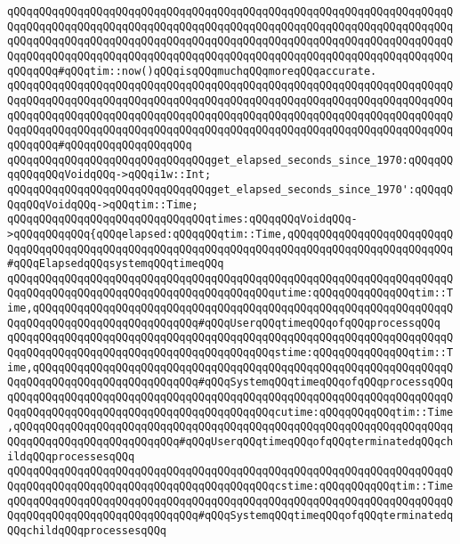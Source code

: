 \verb|qQQqqQQqqQQqqQQqqQQqqQQqqQQqqQQqqQQqqQQqqQQqqQQqqQQqqQQqqQQqqQQqqQQqqQQqqQQqqQQqqQQqqQQqqQQqqQQqqQQqqQQqqQQqqQQqqQQqqQQqqQQqqQQqqQQqqQQqqQQqqQQqqQQqqQQqqQQqqQQqqQQqqQQqqQQqqQQqqQQqqQQqqQQqqQQqqQQqqQQqqQQqqQQqqQQqqQQqqQQqqQQqqQQqqQQqqQQqqQQqqQQqqQQqqQQqqQQqqQQqqQQqqQQqqQQqqQQqqQQqqQQqqQQq#qQQqtim::now()qQQqisqQQqmuchqQQqmoreqQQqaccurate.|\newline
\verb|qQQqqQQqqQQqqQQqqQQqqQQqqQQqqQQqqQQqqQQqqQQqqQQqqQQqqQQqqQQqqQQqqQQqqQQqqQQqqQQqqQQqqQQqqQQqqQQqqQQqqQQqqQQqqQQqqQQqqQQqqQQqqQQqqQQqqQQqqQQqqQQqqQQqqQQqqQQqqQQqqQQqqQQqqQQqqQQqqQQqqQQqqQQqqQQqqQQqqQQqqQQqqQQqqQQqqQQqqQQqqQQqqQQqqQQqqQQqqQQqqQQqqQQqqQQqqQQqqQQqqQQqqQQqqQQqqQQqqQQqqQQqqQQq#qQQqqQQqqQQqqQQqqQQq|\newline
\verb|qQQqqQQqqQQqqQQqqQQqqQQqqQQqqQQqget_elapsed_seconds_since_1970:qQQqqQQqqQQqqQQqVoidqQQq->qQQqi1w::Int;|\newline
\verb|qQQqqQQqqQQqqQQqqQQqqQQqqQQqqQQqget_elapsed_seconds_since_1970':qQQqqQQqqQQqVoidqQQq->qQQqtim::Time;|\newline
\newline
\verb|qQQqqQQqqQQqqQQqqQQqqQQqqQQqqQQqtimes:qQQqqQQqVoidqQQq->qQQqqQQqqQQq{qQQqelapsed:qQQqqQQqtim::Time,qQQqqQQqqQQqqQQqqQQqqQQqqQQqqQQqqQQqqQQqqQQqqQQqqQQqqQQqqQQqqQQqqQQqqQQqqQQqqQQqqQQqqQQqqQQqqQQq#qQQqElapsedqQQqsystemqQQqtimeqQQq|\newline
\verb|qQQqqQQqqQQqqQQqqQQqqQQqqQQqqQQqqQQqqQQqqQQqqQQqqQQqqQQqqQQqqQQqqQQqqQQqqQQqqQQqqQQqqQQqqQQqqQQqqQQqqQQqqQQqqQQqutime:qQQqqQQqqQQqqQQqtim::Time,qQQqqQQqqQQqqQQqqQQqqQQqqQQqqQQqqQQqqQQqqQQqqQQqqQQqqQQqqQQqqQQqqQQqqQQqqQQqqQQqqQQqqQQqqQQqqQQq#qQQqUserqQQqtimeqQQqofqQQqprocessqQQq|\newline
\verb|qQQqqQQqqQQqqQQqqQQqqQQqqQQqqQQqqQQqqQQqqQQqqQQqqQQqqQQqqQQqqQQqqQQqqQQqqQQqqQQqqQQqqQQqqQQqqQQqqQQqqQQqqQQqqQQqstime:qQQqqQQqqQQqqQQqtim::Time,qQQqqQQqqQQqqQQqqQQqqQQqqQQqqQQqqQQqqQQqqQQqqQQqqQQqqQQqqQQqqQQqqQQqqQQqqQQqqQQqqQQqqQQqqQQqqQQq#qQQqSystemqQQqtimeqQQqofqQQqprocessqQQq|\newline
\verb|qQQqqQQqqQQqqQQqqQQqqQQqqQQqqQQqqQQqqQQqqQQqqQQqqQQqqQQqqQQqqQQqqQQqqQQqqQQqqQQqqQQqqQQqqQQqqQQqqQQqqQQqqQQqqQQqcutime:qQQqqQQqqQQqtim::Time,qQQqqQQqqQQqqQQqqQQqqQQqqQQqqQQqqQQqqQQqqQQqqQQqqQQqqQQqqQQqqQQqqQQqqQQqqQQqqQQqqQQqqQQqqQQqqQQq#qQQqUserqQQqtimeqQQqofqQQqterminatedqQQqchildqQQqprocessesqQQq|\newline
\verb|qQQqqQQqqQQqqQQqqQQqqQQqqQQqqQQqqQQqqQQqqQQqqQQqqQQqqQQqqQQqqQQqqQQqqQQqqQQqqQQqqQQqqQQqqQQqqQQqqQQqqQQqqQQqqQQqcstime:qQQqqQQqqQQqtim::TimeqQQqqQQqqQQqqQQqqQQqqQQqqQQqqQQqqQQqqQQqqQQqqQQqqQQqqQQqqQQqqQQqqQQqqQQqqQQqqQQqqQQqqQQqqQQqqQQqqQQq#qQQqSystemqQQqtimeqQQqofqQQqterminatedqQQqchildqQQqprocessesqQQq|\newline
